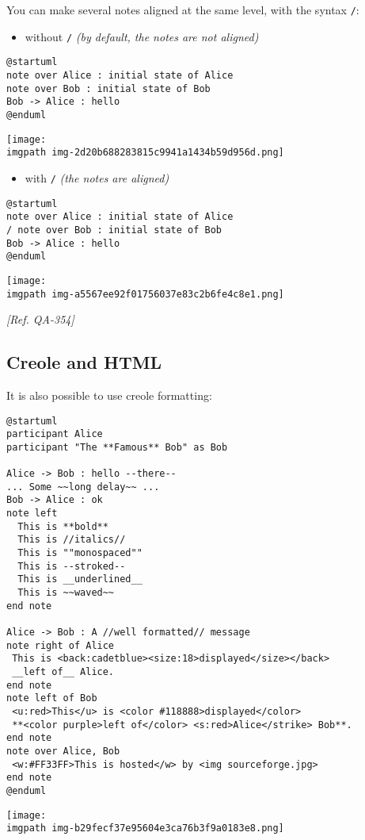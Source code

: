 You can make several notes aligned at the same level, with the syntax \texttt{/}:
\begin{itemize}
\item without \texttt{/} \textit{(by default, the notes are not aligned)}
\end{itemize}
\begin{verbatim}
@startuml
note over Alice : initial state of Alice
note over Bob : initial state of Bob
Bob -> Alice : hello
@enduml
\end{verbatim}
\begin{center}
\texttt{[image: \\imgpath img-2d20b688283815c9941a1434b59d956d.png]}
\end{center}


\begin{itemize}
\item with \texttt{/} \textit{(the notes are aligned)}
\end{itemize}
\begin{verbatim}
@startuml
note over Alice : initial state of Alice
/ note over Bob : initial state of Bob
Bob -> Alice : hello
@enduml
\end{verbatim}
\begin{center}
\texttt{[image: \\imgpath img-a5567ee92f01756037e83c2b6fe4c8e1.png]}
\end{center}


\textit{[Ref. QA-354]}
%
%
\subsection{Creole and HTML}


It is also possible to use creole formatting:


\begin{verbatim}
@startuml
participant Alice
participant "The **Famous** Bob" as Bob

Alice -> Bob : hello --there--
... Some ~~long delay~~ ...
Bob -> Alice : ok
note left
  This is **bold**
  This is //italics//
  This is ""monospaced""
  This is --stroked--
  This is __underlined__
  This is ~~waved~~
end note

Alice -> Bob : A //well formatted// message
note right of Alice
 This is <back:cadetblue><size:18>displayed</size></back>
 __left of__ Alice.
end note
note left of Bob
 <u:red>This</u> is <color #118888>displayed</color>
 **<color purple>left of</color> <s:red>Alice</strike> Bob**.
end note
note over Alice, Bob
 <w:#FF33FF>This is hosted</w> by <img sourceforge.jpg>
end note
@enduml
\end{verbatim}
\begin{center}
\texttt{[image: \\imgpath img-b29fecf37e95604e3ca76b3f9a0183e8.png]}
\end{center}


